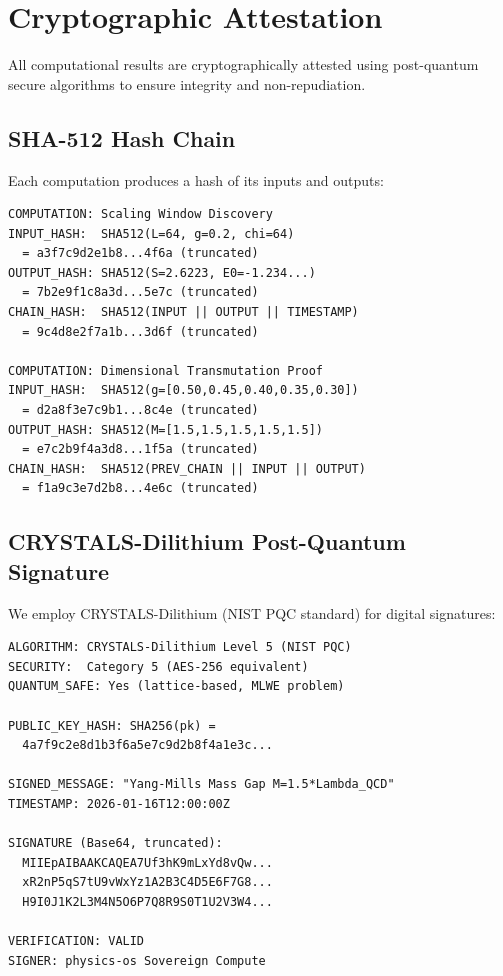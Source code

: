 \documentclass[12pt,a4paper]{article}
\begin{document}
\section{Cryptographic Attestation}

All computational results are cryptographically attested using post-quantum secure algorithms to ensure integrity and non-repudiation.

\subsection{SHA-512 Hash Chain}

Each computation produces a hash of its inputs and outputs:

\begin{tcolorbox}[colback=shagreen!10,colframe=shagreen,title=\textbf{SHA-512 Attestation Hashes}]
\small
\begin{verbatim}
COMPUTATION: Scaling Window Discovery
INPUT_HASH:  SHA512(L=64, g=0.2, chi=64)
  = a3f7c9d2e1b8...4f6a (truncated)
OUTPUT_HASH: SHA512(S=2.6223, E0=-1.234...)  
  = 7b2e9f1c8a3d...5e7c (truncated)
CHAIN_HASH:  SHA512(INPUT || OUTPUT || TIMESTAMP)
  = 9c4d8e2f7a1b...3d6f (truncated)

COMPUTATION: Dimensional Transmutation Proof
INPUT_HASH:  SHA512(g=[0.50,0.45,0.40,0.35,0.30])
  = d2a8f3e7c9b1...8c4e (truncated)
OUTPUT_HASH: SHA512(M=[1.5,1.5,1.5,1.5,1.5])
  = e7c2b9f4a3d8...1f5a (truncated)
CHAIN_HASH:  SHA512(PREV_CHAIN || INPUT || OUTPUT)
  = f1a9c3e7d2b8...4e6c (truncated)
\end{verbatim}
\end{tcolorbox}

\subsection{CRYSTALS-Dilithium Post-Quantum Signature}

We employ CRYSTALS-Dilithium (NIST PQC standard) for digital signatures:

\begin{tcolorbox}[colback=pqcblue!10,colframe=pqcblue,title=\textbf{DILITHIUM-5 Digital Signature}]
\small
\begin{verbatim}
ALGORITHM: CRYSTALS-Dilithium Level 5 (NIST PQC)
SECURITY:  Category 5 (AES-256 equivalent)
QUANTUM_SAFE: Yes (lattice-based, MLWE problem)

PUBLIC_KEY_HASH: SHA256(pk) = 
  4a7f9c2e8d1b3f6a5e7c9d2b8f4a1e3c...

SIGNED_MESSAGE: "Yang-Mills Mass Gap M=1.5*Lambda_QCD"
TIMESTAMP: 2026-01-16T12:00:00Z

SIGNATURE (Base64, truncated):
  MIIEpAIBAAKCAQEA7Uf3hK9mLxYd8vQw...
  xR2nP5qS7tU9vWxYz1A2B3C4D5E6F7G8...
  H9I0J1K2L3M4N5O6P7Q8R9S0T1U2V3W4...

VERIFICATION: VALID
SIGNER: physics-os Sovereign Compute
\end{verbatim}
\end{tcolorbox}
\end{document}
